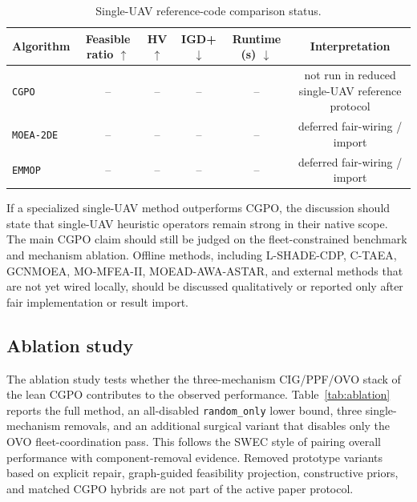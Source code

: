\begin{table}[t]
\centering
\caption{Single-UAV reference-code comparison status.}
\label{tab:reference-code}
\small
\setlength{\tabcolsep}{4pt}
\begin{tabular*}{\textwidth}{@{\extracolsep{\fill}}lccccc}
\toprule
Algorithm & Feasible ratio $\uparrow$ & HV $\uparrow$ & IGD+ $\downarrow$ & Runtime (s) $\downarrow$ & Interpretation \\
\midrule
\texttt{CGPO} & -- & -- & -- & -- & not run in reduced single-UAV reference protocol \\
\texttt{MOEA-2DE} & -- & -- & -- & -- & deferred fair-wiring / import \\
\texttt{EMMOP} & -- & -- & -- & -- & deferred fair-wiring / import \\
\bottomrule
\end{tabular*}
\end{table}

If a specialized single-UAV method outperforms CGPO, the discussion should state that single-UAV heuristic operators remain strong in their native scope. The main CGPO claim should still be judged on the fleet-constrained benchmark and mechanism ablation. Offline methods, including L-SHADE-CDP, C-TAEA, GCNMOEA, MO-MFEA-II, MOEAD-AWA-ASTAR, and external methods that are not yet wired locally, should be discussed qualitatively or reported only after fair implementation or result import.

\subsection{Ablation study}
\label{subsec:ablation}

The ablation study tests whether the three-mechanism CIG/PPF/OVO stack of the lean CGPO contributes to the observed performance. Table~\ref{tab:ablation} reports the full method, an all-disabled \texttt{random\_only} lower bound, three single-mechanism removals, and an additional surgical variant that disables only the OVO fleet-coordination pass. This follows the SWEC style of pairing overall performance with component-removal evidence. Removed prototype variants based on explicit repair, graph-guided feasibility projection, constructive priors, and matched CGPO hybrids are not part of the active paper protocol.

